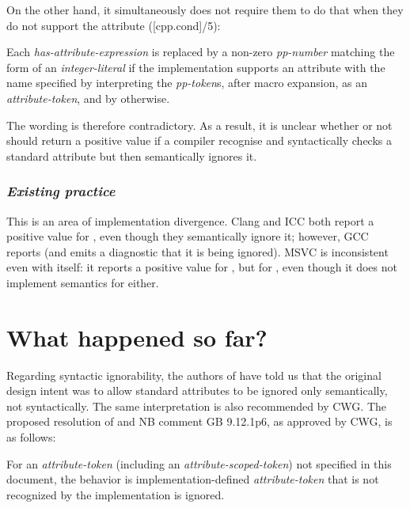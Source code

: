 On the other hand, it simultaneously does not require them to do that when they do not support the attribute ([cpp.cond]/5):

\begin{adjustwidth}{0.5cm}{0.5cm}
Each \emph{has-attribute-expression} is replaced by a non-zero \emph{pp-number} matching the form of an \emph{integer-literal} if the implementation supports an attribute with the name specified by interpreting the \emph{pp-token}s, after macro expansion, as an \emph{attribute-token}, and by  otherwise.
\end{adjustwidth}

The wording is therefore contradictory. As a result, it is unclear whether or not \mbox{} should return a positive value if a compiler recognise and syntactically checks a standard attribute but then semantically ignores it. 

\subsubsection*{\emph{Existing practice}}

This is an area of implementation divergence. Clang and ICC both report a positive value for \mbox{}, even though they semantically ignore it; however, GCC reports  (and emits a diagnostic that it is being ignored). MSVC is inconsistent even with itself: it reports a positive value for \mbox{}, but  for \mbox{}, even though it does not implement semantics for either.

\section{What happened so far?}

Regarding syntactic ignorability, the authors of \cite{N2761} have told us that the original design intent was to allow standard attributes to be ignored only semantically, not syntactically. The same interpretation is also recommended by CWG. The proposed resolution of \cite{CWG2538} and NB comment GB 9.12.1p6, as approved by CWG, is as follows:

\begin{adjustwidth}{0.5cm}{0.5cm}
For an \emph{attribute-token} (including an \emph{attribute-scoped-token})  not specified in this document, the behavior is implementation-defined \emph{attribute-token} that is not recognized by the implementation is ignored.

\end{adjustwidth}


